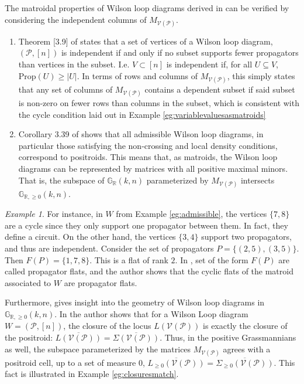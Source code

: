 \documentclass[11pt]{article}
\newcommand{\R}{\mathbb{R}}
\newcommand{\Gr}{\mathbb{G}_{\R, \geq 0}}
\newcommand{\Grall}{\mathbb{G}_{\R}}
\newcommand{\cP}{\mathcal{P}}
\newcommand{\cV}{\mathcal{V}}
\newcommand{\VP}{\cV(\cP)}
\newcommand{\Sigmapos}{\Sigma_{\geq 0}}
\newcommand{\Lpos}{L_{\geq 0}}
\newcommand{\Prop}{\textrm{Prop}}
\theoremstyle{remark}
\newtheorem{eg}[thm]{Example}
\theoremstyle{definition}
\begin{document}
The matroidal properties of Wilson loop diagrams derived in \cite{Wilsonloop}  can be verified by considering the independent columns of $M_{\VP}$.
\begin{enumerate} 
\item Theorem [3.9] of \cite{Wilsonloop} states that a set of vertices of a Wilson loop diagram, $(\cP, [n])$  is independent if and only if no subset supports fewer propagators than vertices in the subset. I.e. $V \subset [n]$ is independent if, for all $U \subseteq V$, $\Prop(U) \geq |U|$. In terms of rows and columns of $M_{\VP}$, this simply states that any set of columns of $M_{\VP}$ contains a dependent subset if said subset is non-zero on fewer rows than columns in the subset, which is consistent with the cycle condition laid out in Example \ref{eg:variablevaluesasmatroids}
\item Corollary 3.39 of \cite{Wilsonloop} shows that all admissible Wilson loop diagrams, in particular those satisfying the non-crossing and local density conditions, correspond to positroids. This means that, as matroids, the Wilson loop diagrams can be represented by matrices with all positive maximal minors. That is, the subspace of $\Grall(k,n)$ parameterized by $M_{\VP}$ intersects $\Gr(k,n)$.
\end{enumerate}

\begin{eg}\label{eg:wldmatroid} For instance, in $W$  from Example \ref{eg:admissible}, the vertices $\{7,8\}$ are a cycle since they only support one propagator between them. In fact, they define a circuit. On the other hand, the vertices $\{3,4\}$ support two propagators, and thus are independent. Consider the set of propagators $P = \{ (2, 5), (3, 5)\}$. Then $F(P) = \{ 1, 7, 8\}$. This is a flat of rank $2$. In \cite{Wilsonloop}, set of the form $F(P)$ are called propagator flats, and the author shows that the cyclic flats of the matroid associated to $W$ are propagator flats.
\end{eg}

Furthermore, \cite{basisshapeloci} gives insight into the geometry of Wilson loop diagrams in $\Gr(k,n)$. In \cite[Theorem 8.4]{basisshapeloci} the author shows that for a Wilson Loop diagram $W = (\cP, [n])$, the closure of the locus $L(\VP)$ is exactly the closure of the positroid: $\overline{L(\VP)} = \overline{\Sigma(\VP)}$. Thus, in the positive Grassmannians as well, the subspace parameterized by the matrices $M_{\VP}$ agrees with a positroid cell, up to a set of measure 0, $\overline{\Lpos(\VP)} = \overline{\Sigmapos(\VP)}$. This fact is illustrated in Example \ref{eg:closuresmatch}.
\end{document}
